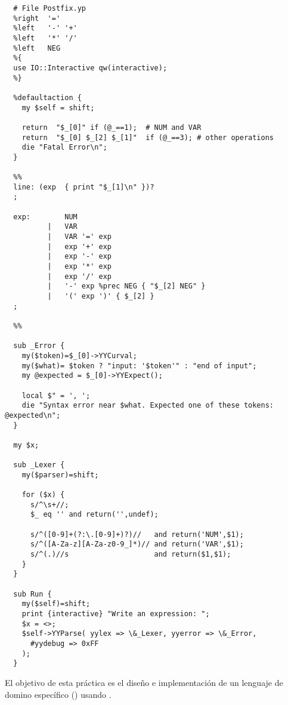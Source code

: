 \begin{verbatim}
  # File Postfix.yp
  %right  '='
  %left   '-' '+'
  %left   '*' '/'
  %left   NEG
  %{
  use IO::Interactive qw(interactive);
  %}

  %defaultaction {
    my $self = shift;

    return  "$_[0]" if (@_==1);  # NUM and VAR
    return  "$_[0] $_[2] $_[1]"  if (@_==3); # other operations
    die "Fatal Error\n";
  }

  %%
  line: (exp  { print "$_[1]\n" })?
  ;

  exp:        NUM
          |   VAR
          |   VAR '=' exp
          |   exp '+' exp
          |   exp '-' exp
          |   exp '*' exp
          |   exp '/' exp
          |   '-' exp %prec NEG { "$_[2] NEG" }
          |   '(' exp ')' { $_[2] }
  ;

  %%

  sub _Error {
    my($token)=$_[0]->YYCurval;
    my($what)= $token ? "input: '$token'" : "end of input";
    my @expected = $_[0]->YYExpect();

    local $" = ', ';
    die "Syntax error near $what. Expected one of these tokens: @expected\n";
  }

  my $x;

  sub _Lexer {
    my($parser)=shift;

    for ($x) {
      s/^\s+//;
      $_ eq '' and return('',undef);

      s/^([0-9]+(?:\.[0-9]+)?)//   and return('NUM',$1);
      s/^([A-Za-z][A-Za-z0-9_]*)// and return('VAR',$1);
      s/^(.)//s                    and return($1,$1);
    }
  }

  sub Run {
    my($self)=shift;
    print {interactive} "Write an expression: ";
    $x = <>;
    $self->YYParse( yylex => \&_Lexer, yyerror => \&_Error,
      #yydebug => 0xFF
    );
  }
\end{verbatim}


El objetivo de esta práctica  es el diseño e implementación de un lenguaje de domino específico
() usando .

